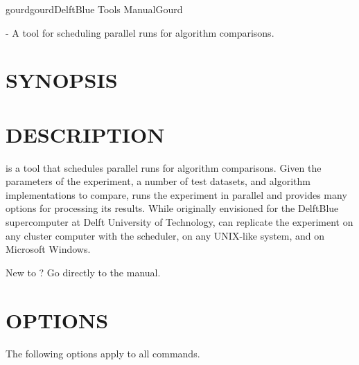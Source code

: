 \documentclass[a4paper,english]{article}
\begin{document}
    \pagestyle{fancy}


    \begin{Name}{1}{gourd}{gourd}{DelftBlue Tools Manual}{Gourd}
\begin{adjustwidth}{18pt}{0pt}

         - A tool for scheduling parallel runs for algorithm comparisons.

\end{adjustwidth}
    \end{Name}


\begin{adjustwidth}{18pt}{0pt}
    \section{SYNOPSIS}

         

    \section{DESCRIPTION}

         is a tool that schedules parallel runs for algorithm comparisons.
        Given the parameters of the experiment, a number of test datasets, and algorithm implementations to compare,
         runs the experiment in parallel and provides many options for processing its results.
        While originally envisioned for the DelftBlue supercomputer at Delft University of Technology,
         can replicate the experiment on any cluster computer with the  scheduler,
        on any UNIX-like system, and on Microsoft Windows.

        New to ? Go directly to the  manual.


    \section{OPTIONS}

        The following options apply to all  commands.


\end{adjustwidth}
\end{document}
